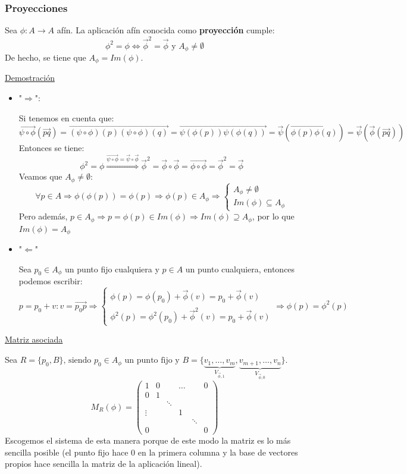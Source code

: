 \documentclass[10pt,a4paper,openright]{book}
\begin{document}
\subsubsection*{Proyecciones}
Sea $\phi : A \to A$ afín. La aplicación afín conocida como \textbf{proyección} cumple:
$$\phi^2 = \phi \Leftrightarrow \vec{\phi}^2 = \vec{\phi} \mbox{ y } A_\phi \neq \emptyset$$
De hecho, se tiene que $A_\phi = Im(\phi)$.

\underline{Demostración}
\begin{itemize}
\item "$\Rightarrow$":

Si tenemos en cuenta que:
$$\overrightarrow{\psi \circ \phi}(\vec{pq}) = \overrightarrow{(\psi \circ \phi)(p) (\psi \circ \phi)(q)} = \overrightarrow{\psi (\phi (p)) \psi (\phi (q))} = \vec{\psi}(\overrightarrow{\phi(p) \phi(q)}) = \vec{\psi} (\vec{\phi} (\vec{pq}))$$
Entonces se tiene:
$$\phi^2 = \phi \overset{\overrightarrow{\psi \circ \phi} = \vec{\psi} \circ \vec{\phi}}{\Longrightarrow} \vec{\phi}^2 = \vec{\phi} \circ \vec{\phi} = \overrightarrow{\phi \circ \phi} = \vec{\phi}^2 = \vec{\phi}$$
Veamos que $A_\phi \neq \emptyset$:
$$\forall p \in A \Rightarrow \phi(\phi(p)) = \phi (p) \Rightarrow \phi(p) \in A_\phi \Rightarrow \begin{cases} A_\phi \neq \emptyset \\ Im(\phi) \subseteq A_\phi \end{cases}$$
Pero además, $p \in A_\phi \Rightarrow p = \phi(p) \in Im(\phi) \Rightarrow Im(\phi) \supseteq A_\phi $, por lo que $Im (\phi) = A_\phi$

\item "$\Leftarrow$"

Sea $p_0 \in A_\phi$ un punto fijo cualquiera y $p \in A$ un punto cualquiera, entonces podemos escribir:
$$p = p_0 + v : v = \vec{p_0p} \Rightarrow \begin{cases} \phi(p) = \phi(p_0) + \vec{\phi}(v) = p_0 + \vec{\phi}(v) \\ \phi^2(p) = \phi^2(p_0) + \vec{\phi}^2(v) = p_0 + \vec{\phi}(v) \end{cases} \Rightarrow \phi(p) = \phi^2 (p)$$
\end{itemize}

\underline{Matriz asociada}

Sea $R = \{p_0, B\} \mbox{, siendo } p_0 \in A_\phi \mbox{ un punto fijo y } B = \{\underbrace{v_1, \ldots, v_m}_{V_{\vec{\phi}, 1}}, \underbrace{v_{m+1}, \ldots, v_n}_{V_{\vec{\phi}, 0}} \}$.
$$M_{R} (\phi) = \left(\begin{array}{c|ccccc}
1  & 0 & & \ldots & & 0 \\
\hline
0  & 1 & & & & \\
& & \ddots & & & \\
\vdots &  & & 1 & & \\
&  & &  & \ddots & \\
0 & & & & & 0
\end{array}
\right)$$
Escogemos el sistema de esta manera porque de este modo la matriz es lo más sencilla posible (el punto fijo hace 0 en la primera columna y la base de vectores propios hace sencilla la matriz de la aplicación lineal).
\end{document}

